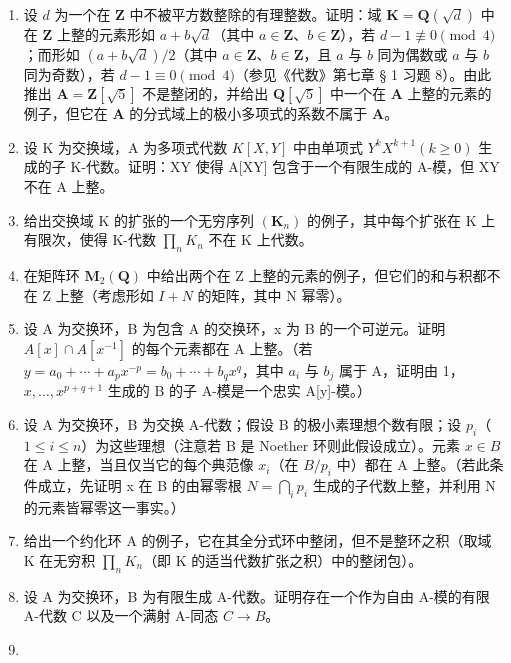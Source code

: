 
\begin{enumerate}
\def\labelenumi{\arabic{enumi}.}
\item
  设 \(d\) 为一个在 \(\mathbf{Z}\) 中不被平方数整除的有理整数。证明：域 \(\mathbf{K} = \mathbf{Q}(\sqrt{d})\) 中在 \(\mathbf{Z}\) 上整的元素形如 \(a + b\sqrt{d}\)（其中 \(a \in \mathbf{Z}\)、\(b \in \mathbf{Z}\)），若 \(d - 1 \not\equiv 0 \pmod{4}\)；而形如 \((a + b\sqrt{d})/2\)（其中 \(a \in \mathbf{Z}\)、\(b \in \mathbf{Z}\)，且 \(a\) 与 \(b\) 同为偶数或 \(a\) 与 \(b\) 同为奇数），若 \(d - 1 \equiv 0 \pmod{4}\)（参见《代数》第七章 § 1 习题 8）。由此推出 \(\mathbf{A} = \mathbf{Z}[\sqrt{5}]\) 不是整闭的，并给出 \(\mathbf{Q}[\sqrt{5}]\) 中一个在 \(\mathbf{A}\) 上整的元素的例子，但它在 \(\mathbf{A}\) 的分式域上的极小多项式的系数不属于 \(\mathbf{A}\)。
\item
  设 K 为交换域，A 为多项式代数 \(K[X, Y]\) 中由单项式 \(Y^{k}X^{k+1} (k \geqslant 0)\) 生成的子 K-代数。证明：XY 使得 A{[}XY{]} 包含于一个有限生成的 A-模，但 XY 不在 A 上整。
\item
  给出交换域 K 的扩张的一个无穷序列 \((\mathbf{K}_{n})\) 的例子，其中每个扩张在 K 上有限次，使得 K-代数 \(\prod_{n} K_{n}\) 不在 K 上代数。
\item
  在矩阵环 \(\mathbf{M}_{2}(\mathbf{Q})\) 中给出两个在 Z 上整的元素的例子，但它们的和与积都不在 Z 上整（考虑形如 \(I + N\) 的矩阵，其中 N 幂零）。
\item
  设 A 为交换环，B 为包含 A 的交换环，x 为 B 的一个可逆元。证明 \(A[x] \cap A[x^{-1}]\) 的每个元素都在 A 上整。（若 \(y = a_{0} + \cdots + a_{p}x^{-p} = b_{0} + \cdots + b_{q}x^{q}\)，其中 \(a_{i}\) 与 \(b_{j}\) 属于 A，证明由 1，\(x, \ldots, x^{p+q+1}\) 生成的 B 的子 A-模是一个忠实 A{[}y{]}-模。）
\item
  设 A 为交换环，B 为交换 A-代数；假设 B 的极小素理想个数有限；设 \(p_{i}\)（\(1 \leqslant i \leqslant n\)）为这些理想（注意若 B 是 Noether 环则此假设成立）。元素 \(x \in B\) 在 A 上整，当且仅当它的每个典范像 \(x_{i}\)（在 \(B/p_{i}\) 中）都在 A 上整。（若此条件成立，先证明 x 在 B 的由幂零根 \(N = \bigcap_{i} p_{i}\) 生成的子代数上整，并利用 N 的元素皆幂零这一事实。）
\item
  给出一个约化环 A 的例子，它在其全分式环中整闭，但不是整环之积（取域 K 在无穷积 \(\prod_{n} K_{n}\)（即 K 的适当代数扩张之积）中的整闭包）。
\item
  设 A 为交换环，B 为有限生成 A-代数。证明存在一个作为自由 A-模的有限 A-代数 C 以及一个满射 A-同态 \(C \rightarrow B\)。
\item

\end{enumerate}
